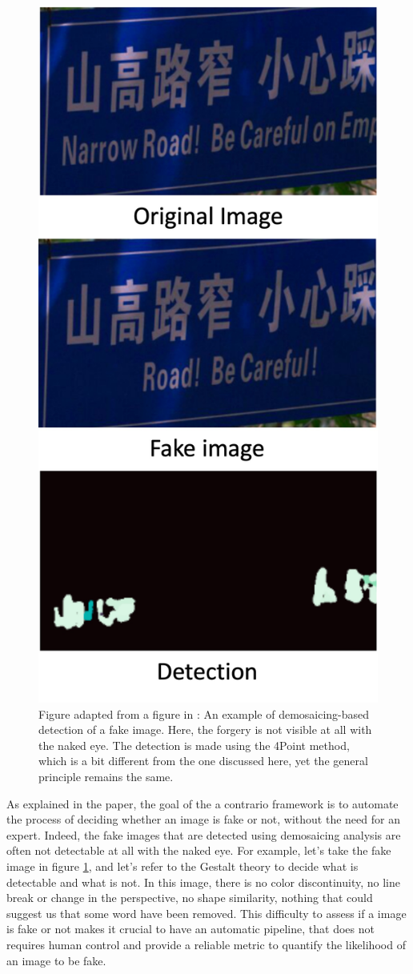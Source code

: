 \documentclass[sigconf, nonacm]{acmart}
\begin{document}
\begin{figure}[!h]
    \centering
    \includegraphics[width=0.7\columnwidth]{figures/Figure 2.jpg}
    \caption{Figure adapted from a figure in \cite{bammey_forgery_2022}: An example of demosaicing-based detection of a fake image. {\normalfont Here, the forgery is not visible at all with the naked eye. The detection is made using the 4Point method, which is a bit different from the one discussed here, yet the general principle remains the same.}}
    \label{fig:example_fake}
\end{figure}

As explained in the paper, the goal of the a contrario framework is to automate the process of deciding whether an image is fake or not, without the need for an expert. Indeed, the fake images that are detected using demosaicing analysis are often not detectable at all with the naked eye. For example, let's take the fake image in figure \ref{fig:example_fake}, and let's refer to the Gestalt theory \cite{von_ehrenfels_uber_1890, morel_detection_2021} to decide what is detectable and what is not. In this image, there is no color discontinuity, no line break or change in the perspective, no shape similarity, nothing that could suggest us that some word have been removed. This difficulty to assess if a image is fake or not makes it crucial to have an automatic pipeline, that does not requires human control and provide a reliable metric to quantify the likelihood of an image to be fake.
\end{document}
